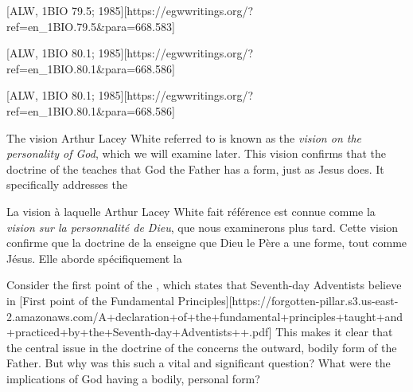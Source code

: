 [ALW, 1BIO 79.5; 1985][https://egwwritings.org/?ref=en\_1BIO.79.5&para=668.583]


[ALW, 1BIO 80.1; 1985][https://egwwritings.org/?ref=en\_1BIO.80.1&para=668.586]


[ALW, 1BIO 80.1; 1985][https://egwwritings.org/?ref=en\_1BIO.80.1&para=668.586]


The vision Arthur Lacey White referred to is known as the \textit{vision on the personality of God}, which we will examine later. This vision confirms that the doctrine of the  teaches that God the Father has a form, just as Jesus does. It specifically addresses the 


La vision à laquelle Arthur Lacey White fait référence est connue comme la \textit{vision sur la personnalité de Dieu}, que nous examinerons plus tard. Cette vision confirme que la doctrine de la  enseigne que Dieu le Père a une forme, tout comme Jésus. Elle aborde spécifiquement la 


Consider the first point of the , which states that Seventh-day Adventists believe in [First point of the Fundamental Principles][https://forgotten-pillar.s3.us-east-2.amazonaws.com/A+declaration+of+the+fundamental+principles+taught+and+practiced+by+the+Seventh-day+Adventists++.pdf] This makes it clear that the central issue in the doctrine of the  concerns the outward, bodily form of the Father. But why was this such a vital and significant question? What were the implications of God having a bodily, personal form?


